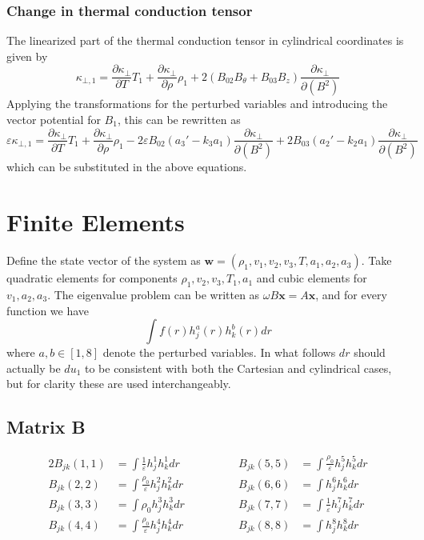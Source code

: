 \documentclass[11pt, fleqn]{article}
\newcommand{\eps}{\varepsilon}
\begin{document}
\subsubsection{Change in thermal conduction tensor}
The linearized part of the thermal conduction tensor in cylindrical coordinates is given by
\begin{equation}
	\kappa_{\bot, 1} = \frac{\partial \kappa_\bot}{\partial T}T_1 + \frac{\partial \kappa_\bot}{\partial \rho}\rho_1 + 2\left(B_{02}B_\theta + B_{03}B_z\right)\frac{\partial \kappa_\bot}{\partial(B^2)}
\end{equation}
Applying the transformations for the perturbed variables and introducing the vector potential for $B_1$, this can be rewritten as
\begin{equation}
	\eps\kappa_{\bot, 1} = \frac{\partial \kappa_\bot}{\partial T}T_1 + \frac{\partial \kappa_\bot}{\partial \rho}\rho_1 - 2\eps B_{02}\left(a_3' - k_3a_1\right)\frac{\partial \kappa_\bot}{\partial (B^2)}
											+ 2B_{03}\left(a_2' - k_2a_1\right)\frac{\partial \kappa_\bot}{\partial (B^2)}
\end{equation}
which can be substituted in the above equations.



\section{Finite Elements}
Define the state vector of the system as $\boldsymbol{w} = (\rho_1, v_1, v_2, v_3, T, a_1, a_2, a_3)$. Take quadratic elements for components $\rho_1, v_2, v_3, T_1, a_1$ and cubic elements for $v_1, a_2, a_3$.
The eigenvalue problem can be written as $\omega B \boldsymbol{x} = A \boldsymbol{x}$, and for every function we have
\begin{equation}
	\int f(r) h_j^a(r) h_k^b(r)dr
\end{equation}
where $a, b \in [1, 8]$ denote the perturbed variables. In what follows $dr$ should actually be $du_1$ to be consistent with both the Cartesian and cylindrical cases, but for clarity these are used interchangeably.

\subsection{Matrix B}
\begin{alignat*}{2}
	B_{jk}(1, 1) &= \int \frac{1}{\eps} h_j^1 h_k^1 dr							&\qquad\qquad		B_{jk}(5, 5) &= \int \frac{\rho_0}{\eps} h_j^5 h_k^5 dr			\\
	B_{jk}(2, 2) &= \int \frac{\rho_0}{\eps} h_j^2 h_k^2 dr						&\qquad\qquad		B_{jk}(6, 6) &= \int h_j^6 h_k^6 dr								\\
	B_{jk}(3, 3) &= \int \rho_0 h_j^3 h_k^3 dr								    &\qquad\qquad		B_{jk}(7, 7) &= \int \frac{1}{\eps} h_j^7 h_k^7 dr				\\
	B_{jk}(4, 4) &= \int \frac{\rho_0}{\eps} h_j^4 h_k^4 dr						&\qquad\qquad		B_{jk}(8, 8) &= \int h_j^8 h_k^8 dr
\end{alignat*}
\end{document}
